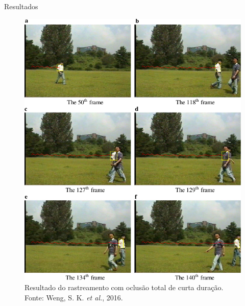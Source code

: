 \documentclass[10pt]{beamer}
\begin{document}
\begin{frame}{Resultados}
\begin{figure}[H]
	\label{fig:short}
	\includegraphics[scale=0.45]{images/result.pdf}
	\caption{Resultado do rastreamento com oclusão total de curta duração. Fonte: Weng, S. K. \textit{et al.}, 2016.}
\end{figure}
\end{frame}
\end{document}
